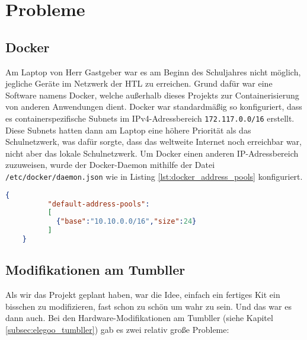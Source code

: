 
\chapter{Probleme}
\label{sec:probleme}
\section{Docker}
\label{subsec:probleme_docker}
Am Laptop von Herr Gastgeber war es am Beginn des Schuljahres nicht möglich,
jegliche Geräte im Netzwerk der HTL zu erreichen.
%
Grund dafür war eine Software namens Docker,
welche außerhalb dieses Projekts zur Containerisierung von anderen Anwendungen dient.
%
Docker war standardmäßig so konfiguriert,
dass es containerspezifische Subnets im IPv4-Adressbereich \allowbreak\texttt{172.117.0.0/16} erstellt.
%
Diese Subnets hatten dann am Laptop eine höhere Priorität als das Schulnetzwerk,
was dafür sorgte,
dass das weltweite Internet noch erreichbar war, 
nicht aber das lokale Schulnetzwerk.
%
Um Docker einen anderen IP-Adressbereich zuzuweisen,
wurde der Docker-Daemon mithilfe der Datei \texttt{/etc/docker/daemon.json}
wie in Listing \ref{lst:docker_address_pools} konfiguriert.
\begin{lstlisting}[language=json,gobble=4,
    label=lst:docker_address_pools,caption=Konfiguration für den Docker-Daemon]
    {
          "default-address-pools":
          [
            {"base":"10.10.0.0/16","size":24}
          ]
    }
\end{lstlisting}

\section{Modifikationen am Tumbller}
\label{subsec:problem_tumbbler_mods}
Als wir das Projekt geplant haben,
war die Idee,
einfach ein fertiges Kit ein bisschen zu modifizieren,
fast schon zu schön um wahr zu sein.
%
Und das war es dann auch.
%
Bei den Hardware-Modifikationen am Tumbller (siehe Kapitel \ref{subsec:elegoo_tumbller}) gab es zwei relativ große Probleme:


